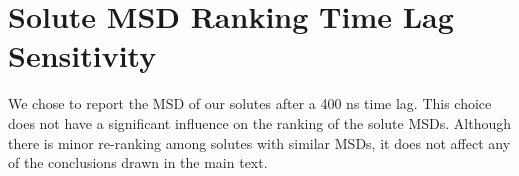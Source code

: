\documentclass{article}
\begin{document}
%  
%  
%  
%  
  \clearpage
  \section{Solute MSD Ranking Time Lag Sensitivity}\label{section:lag_sensitivity}
  
  We chose to report the MSD of our solutes after a 400 ns time lag. This choice does
  not have a significant influence on the ranking of the solute MSDs. Although there
  is minor re-ranking among solutes with similar MSDs, it does not affect any of 
  the conclusions drawn in the main text.
  
\end{document}
